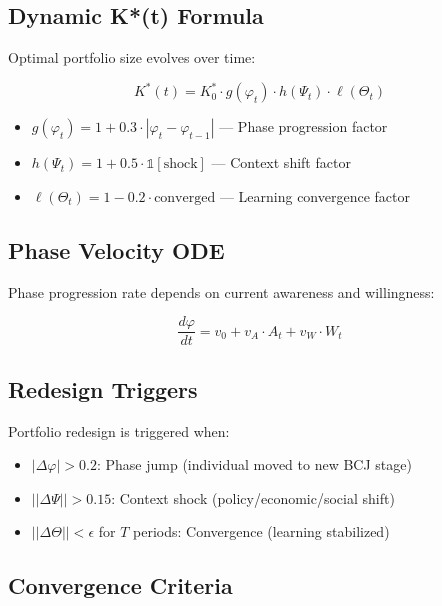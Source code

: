 \subsection{Dynamic K*(t) Formula}

Optimal portfolio size evolves over time:

\begin{equation}
\boxed{
K^*(t) = K^*_0 \cdot g(\varphi_t) \cdot h(\Psi_t) \cdot \ell(\Theta_t)
}
\label{eq:mp-dynamic-k}
\end{equation}

\begin{itemize}[nosep]
\item $g(\varphi_t) = 1 + 0.3 \cdot |\varphi_t - \varphi_{t-1}|$ --- Phase progression factor
\item $h(\Psi_t) = 1 + 0.5 \cdot \mathbb{1}[\text{shock}]$ --- Context shift factor
\item $\ell(\Theta_t) = 1 - 0.2 \cdot \text{converged}$ --- Learning convergence factor
\end{itemize}

\subsection{Phase Velocity ODE}

Phase progression rate depends on current awareness and willingness:

\begin{equation}
\boxed{
\frac{d\varphi}{dt} = v_0 + v_A \cdot A_t + v_W \cdot W_t
}
\label{eq:mp-phase-velocity}
\end{equation}

\subsection{Redesign Triggers}

Portfolio redesign is triggered when:

\begin{itemize}[nosep]
\item $|\Delta\varphi| > 0.2$: Phase jump (individual moved to new BCJ stage)
\item $||\Delta\Psi|| > 0.15$: Context shock (policy/economic/social shift)
\item $||\Delta\Theta|| < \epsilon$ for $T$ periods: Convergence (learning stabilized)
\end{itemize}

\subsection{Convergence Criteria}

